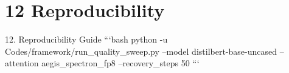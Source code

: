 \section{12 Reproducibility}

 12. Reproducibility Guide
```bash
python -u Codes/framework/run\_quality\_sweep.py --model distilbert-base-uncased --attention aegis\_spectron\_fp8 --recovery\_steps 50
```
